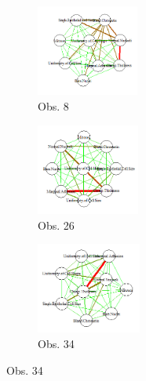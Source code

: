 \begin{figure}[htbp!]
	\begin{center}
		\begin{subfigure}[t]{0.25\textwidth}
			\centering
			\includegraphics[height=3cm]{imagenes/cancer/b1_reciproco.png}
			\caption{Obs. 8}
		\end{subfigure}
		\begin{subfigure}[t]{0.25\textwidth}
			\centering
			\includegraphics[height=3cm]{imagenes/cancer/b2_reciproco.png}
			\caption{Obs. 26}
		\end{subfigure}
		\begin{subfigure}[t]{0.25\textwidth}
			\centering
			\includegraphics[height=3cm]{imagenes/cancer/b3_reciproco.png}
			\caption{Obs. 34}
		\end{subfigure}
		

\end{center}
\end{figure}
